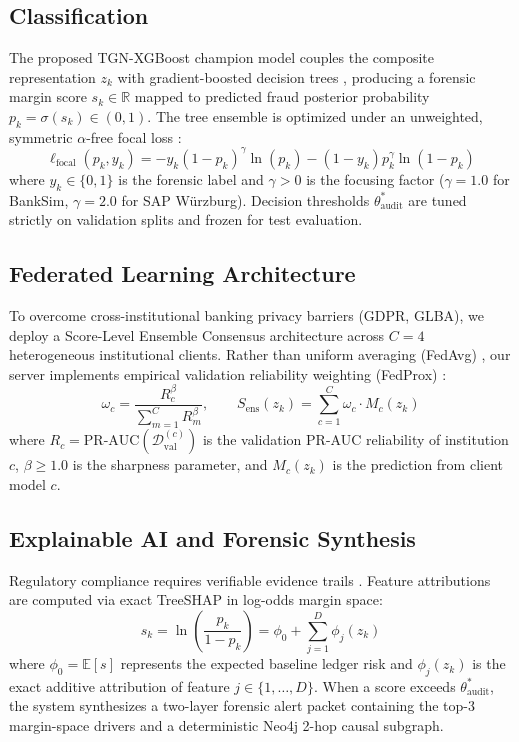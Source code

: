 \documentclass[journal]{IEEEtran}
\begin{document}
\subsection{Classification}\label{sec:model_class}
The proposed TGN-XGBoost champion model couples the composite representation $z_k$ with gradient-boosted decision trees \cite{chen2016xgboost}, producing a forensic margin score $s_k \in \mathbb{R}$ mapped to predicted fraud posterior probability $p_k = \sigma(s_k) \in (0, 1)$. The tree ensemble is optimized under an unweighted, symmetric $\alpha$-free focal loss \cite{lin2017focal}:
\begin{equation}
\ell_{\text{focal}}(p_k, y_k) = - y_k \left(1 - p_k\right)^\gamma \ln\left(p_k\right) - (1 - y_k) p_k^\gamma \ln\left(1 - p_k\right)
\label{eq:focal_objective}
\end{equation}
where $y_k \in \{0, 1\}$ is the forensic label and $\gamma > 0$ is the focusing factor ($\gamma = 1.0$ for BankSim, $\gamma = 2.0$ for SAP W{\"u}rzburg). Decision thresholds $\theta_{\text{audit}}^*$ are tuned strictly on validation splits and frozen for test evaluation.

\subsection{Federated Learning Architecture}\label{sec:model_federated}
To overcome cross-institutional banking privacy barriers (GDPR, GLBA), we deploy a Score-Level Ensemble Consensus architecture across $C=4$ heterogeneous institutional clients. Rather than uniform averaging (FedAvg) \cite{mcmahan2017communication}, our server implements empirical validation reliability weighting (FedProx) \cite{li2020federated}:
\begin{equation}
\omega_c = \frac{R_c^\beta}{\sum_{m=1}^C R_m^\beta}, \qquad S_{\text{ens}}(z_k) = \sum_{c=1}^C \omega_c \cdot M_c\left(z_k\right)
\label{eq:fed_consensus}
\end{equation}
where $R_c = \text{PR-AUC}(\mathcal{D}_{\text{val}}^{(c)})$ is the validation PR-AUC reliability of institution $c$, $\beta \ge 1.0$ is the sharpness parameter, and $M_c(z_k)$ is the prediction from client model $c$.

\subsection{Explainable AI and Forensic Synthesis}\label{sec:model_xai}
Regulatory compliance requires verifiable evidence trails \cite{faccia2026xaiauditing,uddin2026shapley}. Feature attributions are computed via exact TreeSHAP \cite{lundberg2020treeshap} in log-odds margin space:
\begin{equation}
s_k = \ln\left(\frac{p_k}{1 - p_k}\right) = \phi_0 + \sum_{j=1}^D \phi_j\left(z_k\right)
\label{eq:treeshap_additivity}
\end{equation}
where $\phi_0 = \mathbb{E}[s]$ represents the expected baseline ledger risk and $\phi_j(z_k)$ is the exact additive attribution of feature $j \in \{1, \dots, D\}$. When a score exceeds $\theta_{\text{audit}}^*$, the system synthesizes a two-layer forensic alert packet containing the top-3 margin-space drivers and a deterministic Neo4j 2-hop causal subgraph.
\end{document}
